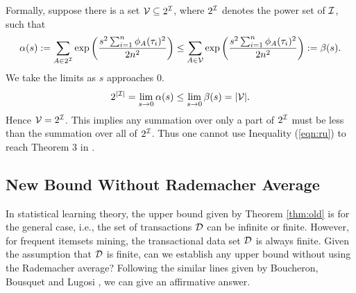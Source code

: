 \documentclass{article}
\begin{document}
Formally, suppose there is a set $\mathcal{V}\subseteq 2^{\mathcal{I}}$, where $2^{\mathcal{I}}$ denotes the power set of $\mathcal{I}$, such that
$$\alpha(s) := \sum_{A\in 2^{\mathcal{I}}}\exp\left(\frac{s^2\sum_{i=1}^n \phi_A(\tau_i)^2}{2n^2}\right) \leq \sum_{A\in \mathcal{V}}\exp\left(\frac{s^2\sum_{i=1}^n \phi_A(\tau_i)^2}{2n^2}\right) :=\beta(s).$$
We take the limits as $s$ approaches 0.
$$2^{|\mathcal{I}|}=\lim_{s\to 0}\alpha(s) \leq \lim_{s\to 0}\beta(s) = |\mathcal{V}|.$$
Hence $\mathcal{V} = 2^{\mathcal{I}}$. This implies any summation over only a part of $2^{\mathcal{I}}$ must be less than the summation over all of $2^{\mathcal{I}}$. Thus one cannot use Inequality (\ref{eqn:ru}) to reach Theorem 3 in \cite{RU15}.

\subsection{New Bound Without Rademacher Average}
In statistical learning theory, the upper bound given by Theorem \ref{thm:old} is for the general case, i.e., the set of transactions $\mathcal{D}$ can be infinite or finite. However, for frequent itemsets mining, the transactional data set $\mathcal{D}$ is always finite. Given the assumption that $\mathcal{D}$ is finite, can we establish any upper bound without using the Rademacher average? Following the similar lines given by Boucheron, Bousquet and Lugosi \cite{BBL04}, we can give an affirmative answer.
\end{document}
